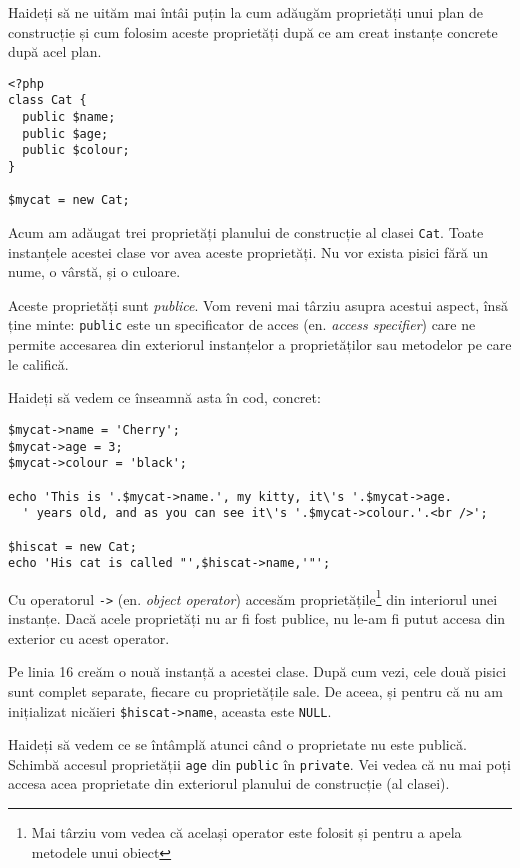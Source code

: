 Haideți să ne uităm mai întâi puțin la cum adăugăm proprietăți unui plan de construcție
și cum folosim aceste proprietăți după ce am creat instanțe concrete după acel plan.

\begin{lstlisting}[title=Public Class Properties]
<?php
class Cat {
  public $name;
  public $age;
  public $colour;
}

$mycat = new Cat;
\end{lstlisting}

Acum am adăugat trei proprietăți planului de construcție al clasei \texttt{Cat}. Toate
instanțele acestei clase vor avea aceste proprietăți. Nu vor exista pisici fără un
nume, o vârstă, și o culoare.

Aceste proprietăți sunt \textsl{publice}. Vom reveni mai târziu asupra acestui aspect,
însă ține minte: \texttt{public} este un specificator de acces (en. \textsl{access specifier})
care ne permite accesarea din exteriorul instanțelor a proprietăților sau metodelor pe 
care le califică.

Haideți să vedem ce înseamnă asta în cod, concret:
\begin{lstlisting}[firstnumber=9,title={Public Class Properties}]
$mycat->name = 'Cherry';
$mycat->age = 3;
$mycat->colour = 'black';

echo 'This is '.$mycat->name.', my kitty, it\'s '.$mycat->age.
  ' years old, and as you can see it\'s '.$mycat->colour.'.<br />';

$hiscat = new Cat;
echo 'His cat is called "',$hiscat->name,'"';
\end{lstlisting}

Cu operatorul \texttt{->} (en. \textsl{object operator}) accesăm
proprietățile\footnote{Mai târziu vom vedea că același operator este
folosit și pentru a apela metodele unui obiect} din interiorul unei instanțe.
Dacă acele proprietăți nu ar fi fost publice, nu le-am fi putut accesa din exterior
cu acest operator.

Pe linia 16 creăm o nouă instanță a acestei clase. După cum vezi, cele două pisici sunt complet
separate, fiecare cu proprietățile sale. De aceea, și pentru
că nu am inițializat nicăieri \texttt{\$hiscat->name}, aceasta este \texttt{NULL}.


Haideți să vedem ce se întâmplă atunci când o proprietate nu este publică.
Schimbă accesul proprietății \texttt{age} din \texttt{public}
în \texttt{private}. Vei vedea că nu mai poți accesa acea proprietate din exteriorul planului
de construcție (al clasei).

